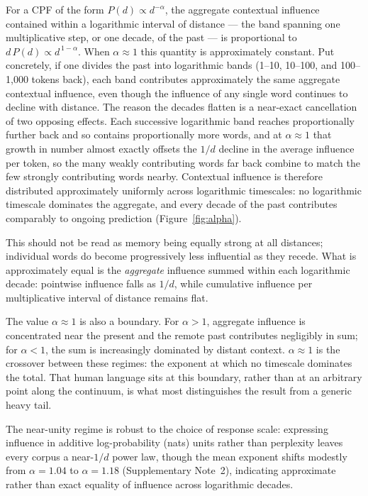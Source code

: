 \documentclass[11pt]{article}
\begin{document}
For a CPF of the form $P(d) \propto d^{-\alpha}$, the aggregate contextual influence contained
within a logarithmic interval of distance --- the band spanning one multiplicative step, or one
decade, of the past --- is proportional to $d\,P(d) \propto d^{\,1-\alpha}$. When $\alpha \approx 1$
this quantity is approximately constant. Put concretely, if one divides the past into logarithmic
bands (1--10, 10--100, and 100--1{,}000 tokens back), each band contributes approximately the
same aggregate contextual influence, even though the influence of any single word continues to
decline with distance. The reason the decades flatten is a near-exact cancellation of two opposing
effects. Each successive logarithmic band reaches proportionally further back and so contains
proportionally more words, and at $\alpha \approx 1$ that growth in number almost exactly offsets
the $1/d$ decline in the average influence per token, so the many weakly contributing words far
back combine to match the few strongly contributing words nearby. Contextual influence is therefore
distributed approximately uniformly across
logarithmic timescales: no logarithmic timescale dominates the aggregate, and every decade of the
past contributes comparably to ongoing prediction (Figure~\ref{fig:alpha}).

This should not be read as memory being equally strong at all distances; individual words do
become progressively less influential as they recede. What is approximately equal is the
\emph{aggregate} influence summed within each logarithmic decade: pointwise influence falls as
$1/d$, while cumulative influence per multiplicative interval of distance remains flat.

The value $\alpha \approx 1$ is also a boundary. For $\alpha > 1$, aggregate influence is
concentrated near the present and the remote past contributes negligibly in sum; for $\alpha < 1$,
the sum is increasingly dominated by distant context. $\alpha \approx 1$ is the crossover between
these regimes: the exponent at which no timescale dominates the total. That human language sits
at this boundary, rather than at an arbitrary point along the continuum, is what most distinguishes
the result from a generic heavy tail.

The near-unity regime is robust to the choice of response scale: expressing influence in additive
log-probability (nats) units rather than perplexity leaves every corpus a near-$1/d$ power law,
though the mean exponent shifts modestly from $\alpha=1.04$ to $\alpha=1.18$ (Supplementary Note~2), indicating approximate rather than exact equality of influence across logarithmic
decades.
\end{document}
